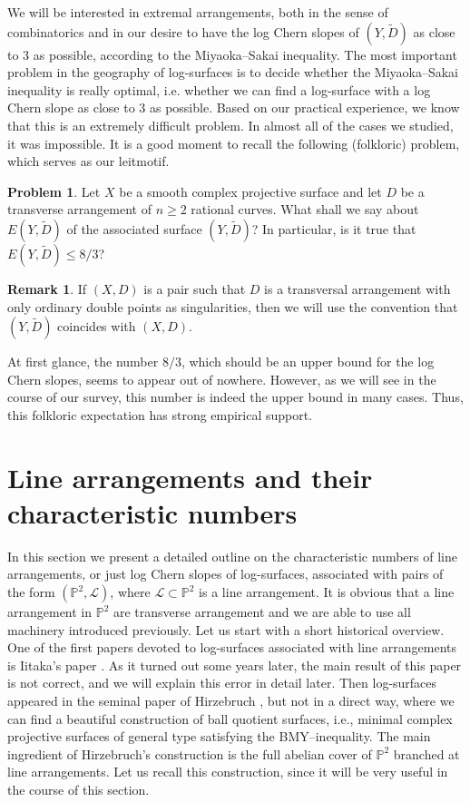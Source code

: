 \documentclass{article}
\theoremstyle{plain}
\theoremstyle{definition}
\newtheorem{remark}[thm]{Remark}
\newtheorem{problem}[thm]{Problem}
\numberwithin{equation}{section}
\begin{document}
We will be interested in extremal arrangements, both in the sense of combinatorics and in our desire to have the log Chern slopes of $(Y, \widetilde{D})$ as close to $3$ as possible, according to the Miyaoka--Sakai inequality. The most important problem in the geography of log-surfaces is to decide whether the Miyaoka--Sakai inequality is really optimal, i.e. whether we can find a log-surface with a log Chern slope as close to $3$ as possible. Based on our practical experience, we know that this is an extremely difficult problem. In almost all of the cases we studied, it was impossible. It is a good moment to recall the following (folkloric) problem, which serves as our leitmotif.
\begin{problem}
\label{main}
Let $X$ be a smooth complex projective surface and let $D$ be a transverse arrangement of $n\geq 2$ rational curves. What shall we say about $E(Y,\widetilde{D})$ of the associated surface $(Y,\widetilde{D})$? In particular, is it true that $E(Y,\widetilde{D}) \leq 8/3$?
\end{problem}
\begin{remark}
If $(X,D)$ is a pair such that $D$ is a transversal arrangement with only ordinary double points as singularities, then we will use the convention that $(Y,\widetilde{D})$ coincides with $(X,D)$.
\end{remark}
At first glance, the number $8/3$, which should be an upper bound for the log Chern slopes, seems to appear out of nowhere. However, as we will see in the course of our survey, this number is indeed the upper bound in many cases. Thus, this folkloric expectation has strong empirical support.

\section{Line arrangements and their characteristic numbers}\label{sec:line_arr}
In this section we present a detailed outline on the characteristic numbers of line arrangements, or just log Chern slopes of log-surfaces, associated with pairs of the form $(\mathbb{P}^{2},\mathcal{L})$, where $\mathcal{L} \subset \mathbb{P}^{2}$ is a line arrangement. It is obvious that a line arrangement in $\mathbb{P}^{2}$ are transverse arrangement and we are able to use all machinery introduced previously. Let us start with a short historical overview. One of the first papers devoted to log-surfaces associated with line arrangements is Iitaka's paper \cite{Iitaka}. As it turned out some years later, the main result of this paper is not correct, and we will explain this error in detail later. Then log-surfaces appeared in the seminal paper of Hirzebruch \cite{Hirzebruch}, but not in a direct way, where we can find a beautiful construction of ball quotient surfaces, i.e., minimal complex projective surfaces of general type satisfying the BMY--inequality. The main ingredient of Hirzebruch's construction is the full abelian cover of $\mathbb{P}^{2}$ branched at line arrangements. Let us recall this construction, since it will be very useful in the course of this section.
\end{document}
